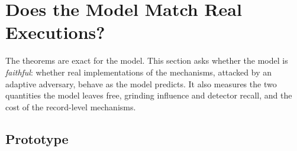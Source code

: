 \section{Does the Model Match Real Executions?}\label{sec:eval}

The theorems are exact for the model. This section asks whether the model is
\emph{faithful}: whether real implementations of the mechanisms, attacked by an adaptive
adversary, behave as the model predicts. It also measures the two quantities the model
leaves free, grinding influence and detector recall, and the cost of the record-level
mechanisms.

\subsection{Prototype}

